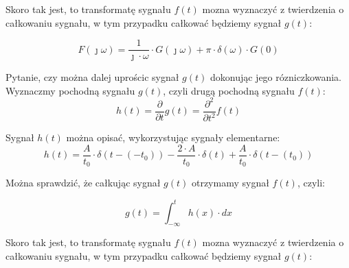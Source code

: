 \begin{task}
Skoro tak jest, to transformatę sygnału $f(t)$ mozna wyznaczyć z twierdzenia o całkowaniu sygnału, w tym przypadku całkować będziemy sygnał $g(t)$:

\begin{equation}
F(\jmath \omega) = \frac{1}{\jmath \cdot \omega} \cdot G(\jmath \omega) + \pi \cdot \delta(\omega) \cdot G(0)
\end{equation}

Pytanie, czy można dalej uprościc sygnał $g(t)$ dokonując jego rózniczkowania. Wyznaczmy pochodną sygnału $g(t)$, czyli drugą pochodną sygnału $f(t)$:
\begin{equation}
h(t)= \frac{\partial}{\partial t}g(t) = \frac{\partial^2}{\partial t^2}f(t) 
\end{equation}

\begin{figure}[H]
	\centering
\end{figure}

Sygnał $h(t)$ można opisać, wykorzystując sygnały elementarne:
\begin{equation}
h(t) = \frac{A}{t_{0}} \cdot \delta(t-(-t_{0})) -\frac{2 \cdot A}{t_{0}} \cdot \delta(t) + \frac{A}{t_{0}} \cdot \delta(t-(t_{0}))
\end{equation}

Można sprawdzić, że całkując sygnał $g(t)$ otrzymamy sygnał $f(t)$, czyli:

\begin{equation}
g(t) = \int_{-\infty}^{t} h(x) \cdot dx
\end{equation}


Skoro tak jest, to transformatę sygnału $f(t)$ mozna wyznaczyć z twierdzenia o całkowaniu sygnału, w tym przypadku całkować będziemy sygnał $g(t)$:


\end{task}
